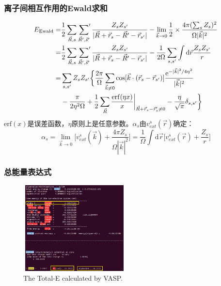 \documentclass[cjk,slidestop,handout,compress,mathserif,blue]{beamer}	%
\begin{document}
\frame
{
	\frametitle{离子间相互作用的\textrm{Ewald}求和}
	\begin{displaymath}
		\begin{aligned}
			E_{\textrm{Ewald}}=&\dfrac12\sum_{\vec R,s}\sideset{}{^{\prime}}\sum_{\vec R^{\prime},\vec s^{\prime}}\dfrac{Z_sZ_{s^{\prime}}}{|\vec R+\vec r_s-\vec R^{\prime}-\vec r_{s^{\prime}}|}-\lim_{\vec k\rightarrow0}\dfrac12\times\dfrac{4\pi(\sum_sZ_s)^2}{\Omega|\vec k|^2}\\
			=&\dfrac12\sum_{\vec R,s}\sideset{}{^{\prime}}\sum_{\vec R^{\prime},\vec s^{\prime}}\dfrac{Z_sZ_{s^{\prime}}}{|\vec R+\vec r_s-\vec R^{\prime}-\vec r_{s^{\prime}}|}-\dfrac1{2\Omega}\sum_{s,s^{\prime}}\int\mathrm{d}\vec r\dfrac{Z_sZ_{s^{\prime}}}r\\
			=&\sum_{s,s^{\prime}}Z_sZ_{s^{\prime}}\bigg\{\dfrac{2\pi}{\Omega}\sum_{\vec k\neq 0}\cos[\vec k\cdot(\vec r_s-\vec r_{s^{\prime}})]\dfrac{\mathrm{e}^{-|\vec k|^2/4\eta^2}}{|\vec k|^2}\\
			&-\dfrac{\pi}{2\eta^2\Omega}+\dfrac12\sum_{\vec R}\dfrac{\mathrm{erf}(\eta x)}x\bigg|_{\vec R+\vec r_s-\vec r_s^{\prime}\neq0}-\dfrac{\eta}{\sqrt{\pi}}\delta_{s,s^{\prime}}\bigg\}
		\end{aligned}
	\end{displaymath}
	$\mathrm{erf}(x)$是误差函数，$\eta$原则上是任意参数。$\alpha_s$由$v_{ext}^s(\vec r)$确定：
	\begin{displaymath}
		\alpha_s=\lim_{\vec k\rightarrow0}\bigg[v_{ext}^s(\vec k)+\dfrac{4\pi Z_s}{\Omega|\vec k|^2}\bigg]=\dfrac1{\Omega}\int\mathrm{d}\vec r\bigg[v_{ext}^s(\vec r)+\dfrac{Z_s}r\bigg]
	\end{displaymath}
}

\frame
{
	\frametitle{总能量表达式}
\fontsize{6.5pt}{4.2pt}
\begin{figure}[h!]
\centering
\vspace*{-0.18in}
\includegraphics[height=1.85in,width=2.2in,viewport=0 0 600 495,clip]{Figures/VASP_Total_ENE.png}
\caption{\small \textrm{The Total-E calculated by VASP.}}%
\label{TOTEN_VASP}
\end{figure}
}
\end{document}
